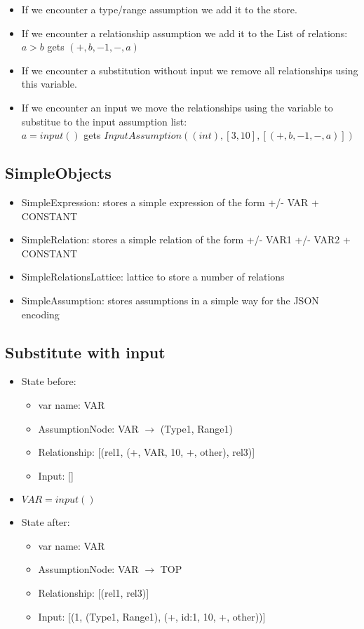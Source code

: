\documentclass[11pt]{article}
\begin{document}
\begin{itemize}
    \item If we encounter a type/range assumption we add it to the store.
    \item If we encounter a relationship assumption we add it to the List of relations:\\
    $a > b$ gets $(+, b, -1, -, a)$
    \item If we encounter a substitution without input we remove all relationships using this variable.
    \item If we encounter an input we move the relationships using the variable to substitue to the input assumption list:\\
    $a = input()$ gets $InputAssumption((int), [3, 10], [(+, b, -1, -, a)])$
\end{itemize}

\subsection{SimpleObjects}

\begin{itemize}
    \item SimpleExpression: stores a simple expression of the form +/- VAR + CONSTANT
    \item SimpleRelation: stores a simple relation of the form +/- VAR1 +/- VAR2 + CONSTANT
    \item SimpleRelationsLattice: lattice to store a number of relations
    \item SimpleAssumption: stores assumptions in a simple way for the JSON encoding
\end{itemize}

\subsection{Substitute with input}

\begin{itemize}
    \item State before:
    \begin{itemize}
        \item var name: VAR
        \item AssumptionNode: VAR $\rightarrow$ (Type1, Range1)
        \item Relationship: [(rel1, (+, VAR, 10, +, other), rel3)]
        \item Input: []
    \end{itemize}
    \item $VAR = input()$
    \item State after:
    \begin{itemize}
        \item var name: VAR
        \item AssumptionNode: VAR $\rightarrow$ TOP
        \item Relationship: [(rel1, rel3)]
        \item Input: [(1, (Type1, Range1), (+, id:1, 10, +, other))]
    \end{itemize}
\end{itemize}
\end{document}

